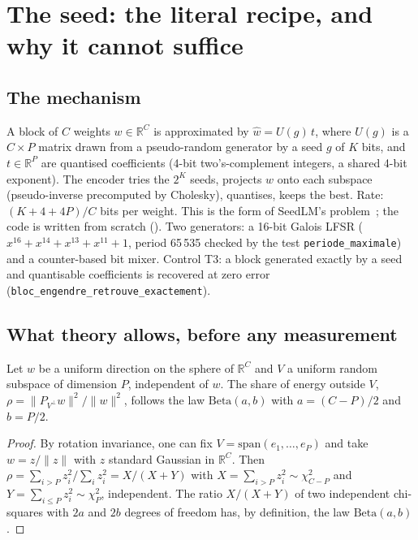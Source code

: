 \section{The seed: the literal recipe, and why it cannot suffice}\label{t3gen:sec:graine}

\subsection{The mechanism}

A block of $C$ weights $w \in \mathbb{R}^C$ is approximated by $\hat w = U(g)\,t$, where $U(g)$ is a $C \times P$ matrix drawn from a pseudo-random generator by a seed $g$ of $K$ bits, and $t \in \mathbb{R}^P$ are quantised coefficients (4-bit two's-complement integers, a shared 4-bit exponent). The encoder tries the $2^K$ seeds, projects $w$ onto each subspace (pseudo-inverse precomputed by Cholesky), quantises, keeps the best. Rate: $(K + 4 + 4P)/C$ bits per weight. This is the form of SeedLM's problem~\cite{shafipour2024seedlm}; the code is written from scratch (). Two generators: a 16-bit Galois LFSR ($x^{16} + x^{14} + x^{13} + x^{11} + 1$, period 65\,535 checked by the test \texttt{periode\_maximale}) and a counter-based bit mixer. Control T3: a block generated exactly by a seed and quantisable coefficients is recovered at zero error (\texttt{bloc\_engendre\_retrouve\_exactement}).

\subsection{What theory allows, before any measurement}

\begin{lemme}\label{t3gen:lem:beta}
Let $w$ be a uniform direction on the sphere of $\mathbb{R}^C$ and $V$ a uniform random subspace of dimension $P$, independent of $w$. The share of energy outside $V$, $\rho = \|P_{V^\perp} w\|^2 / \|w\|^2$, follows the law $\mathrm{Beta}(a, b)$ with $a = (C - P)/2$ and $b = P/2$.
\end{lemme}

\begin{proof}
By rotation invariance, one can fix $V = \mathrm{span}(e_1, \ldots, e_P)$ and take $w = z / \|z\|$ with $z$ standard Gaussian in $\mathbb{R}^C$. Then $\rho = \sum_{i > P} z_i^2 / \sum_i z_i^2 = X/(X + Y)$ with $X = \sum_{i>P} z_i^2 \sim \chi^2_{C-P}$ and $Y = \sum_{i \le P} z_i^2 \sim \chi^2_P$, independent. The ratio $X/(X+Y)$ of two independent chi-squares with $2a$ and $2b$ degrees of freedom has, by definition, the law $\mathrm{Beta}(a, b)$.
\end{proof}

